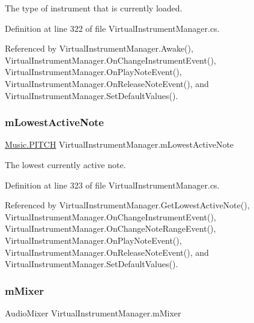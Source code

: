 The type of instrument that is currently loaded. 



Definition at line 322 of file Virtual\+Instrument\+Manager.\+cs.



Referenced by Virtual\+Instrument\+Manager.\+Awake(), Virtual\+Instrument\+Manager.\+On\+Change\+Instrument\+Event(), Virtual\+Instrument\+Manager.\+On\+Play\+Note\+Event(), Virtual\+Instrument\+Manager.\+On\+Release\+Note\+Event(), and Virtual\+Instrument\+Manager.\+Set\+Default\+Values().

\mbox{\label{group___v_i_m_priv_ga5e3a5116e0dabb37e0ea21d73ac1567e}} 
\subsubsection{\texorpdfstring{m\+Lowest\+Active\+Note}{mLowestActiveNote}}
{\footnotesize\ttfamily \hyperlink{group___music_enums_ga508f69b199ea518f935486c990edac1d}{Music.\+P\+I\+T\+CH} Virtual\+Instrument\+Manager.\+m\+Lowest\+Active\+Note\hspace{0.3cm}{\ttfamily [private]}}



The lowest currently active note. 



Definition at line 323 of file Virtual\+Instrument\+Manager.\+cs.



Referenced by Virtual\+Instrument\+Manager.\+Get\+Lowest\+Active\+Note(), Virtual\+Instrument\+Manager.\+On\+Change\+Instrument\+Event(), Virtual\+Instrument\+Manager.\+On\+Change\+Note\+Range\+Event(), Virtual\+Instrument\+Manager.\+On\+Play\+Note\+Event(), Virtual\+Instrument\+Manager.\+On\+Release\+Note\+Event(), and Virtual\+Instrument\+Manager.\+Set\+Default\+Values().

\mbox{\label{group___v_i_m_priv_ga08c8db1bb89f4ab1e28451dd93d6b99c}} 
\subsubsection{\texorpdfstring{m\+Mixer}{mMixer}}
{\footnotesize\ttfamily Audio\+Mixer Virtual\+Instrument\+Manager.\+m\+Mixer\hspace{0.3cm}{\ttfamily [private]}}



